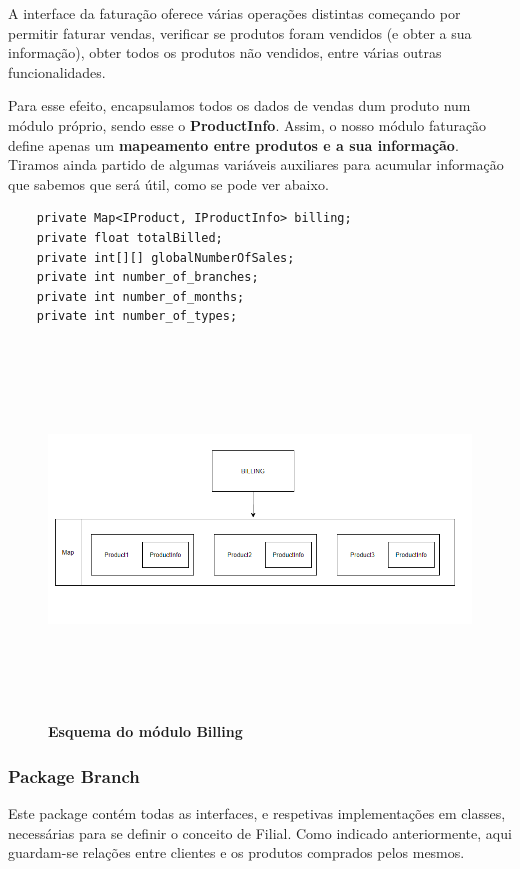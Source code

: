 \documentclass[11pt]{article}
\begin{document}
A interface da faturação oferece várias operações distintas começando por permitir faturar vendas, verificar se produtos foram vendidos (e obter a sua informação), obter todos os produtos não vendidos, entre várias outras funcionalidades.

Para esse efeito, encapsulamos todos os dados de vendas dum produto num módulo próprio, sendo esse o \textbf{ProductInfo}. Assim, o nosso módulo faturação define apenas um \textbf{mapeamento entre produtos e a sua informação}. Tiramos ainda partido de algumas variáveis auxiliares para acumular informação que sabemos que será útil, como se pode ver abaixo.
\begin{verbatim}
    private Map<IProduct, IProductInfo> billing;
    private float totalBilled;
    private int[][] globalNumberOfSales;
    private int number_of_branches;
    private int number_of_months;
    private int number_of_types; 
\end{verbatim}
\vspace{1cm}
\begin{figure}[H]
    \centering
    \includegraphics[width=\textwidth,height=10cm]{images/esquema_billing.png}
    \caption{\textbf{Esquema do módulo Billing}}
\end{figure}

\subsubsection{Package Branch}
Este package contém todas as interfaces, e respetivas implementações em classes, necessárias para se definir o conceito de Filial. Como indicado anteriormente, aqui guardam-se relações entre clientes e os produtos comprados pelos mesmos.
\end{document}
